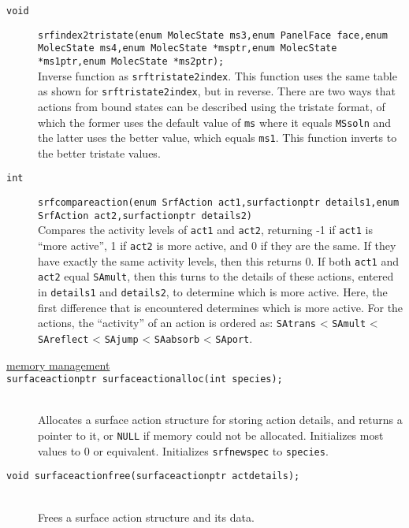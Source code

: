 \documentclass {book}
\begin{document}
\begin{description}
\item[\texttt{void}]
\texttt{srfindex2tristate(enum MolecState ms3,enum PanelFace face,enum MolecState ms4,enum MolecState *msptr,enum MolecState *ms1ptr,enum MolecState *ms2ptr);}
\hfill \\
Inverse function as \texttt{srftristate2index}.  This function uses the same table as shown for \texttt{srftristate2index}, but in reverse.  There are two ways that actions from bound states can be described using the tristate format, of which the former uses the default value of \texttt{ms} where it equals \texttt{MSsoln} and the latter uses the better value, which equals \texttt{ms1}.  This function inverts to the better tristate values.

\item[\texttt{int}]
\texttt{srfcompareaction(enum SrfAction act1,surfactionptr details1,enum SrfAction act2,surfactionptr details2)}
\hfill \\
Compares the activity levels of \texttt{act1} and \texttt{act2}, returning -1 if \texttt{act1} is ``more active'', 1 if \texttt{act2} is more active, and 0 if they are the same.  If they have exactly the same activity levels, then this returns 0.  If both \texttt{act1} and \texttt{act2} equal \texttt{SAmult}, then this turns to the details of these actions, entered in \texttt{details1} and \texttt{details2}, to determine which is more active.  Here, the first difference that is encountered determines which is more active.  For the actions, the ``activity'' of an action is ordered as: \texttt{SAtrans} < \texttt{SAmult} < \texttt{SAreflect} < \texttt{SAjump} < \texttt{SAabsorb} < \texttt{SAport}.

\item[\underline{memory management}]

\item[\texttt{surfaceactionptr surfaceactionalloc(int species);}]
\hfill \\
Allocates a surface action structure for storing action details, and returns a pointer to it, or \texttt{NULL} if memory could not be allocated.  Initializes most values to 0 or equivalent.  Initializes \texttt{srfnewspec} to \texttt{species}.

\item[\texttt{void surfaceactionfree(surfaceactionptr actdetails);}]
\hfill \\
Frees a surface action structure and its data.


\end{description}
\end{document}
